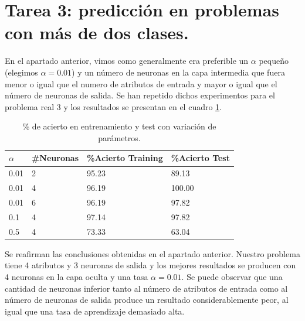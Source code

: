 \documentclass[spanish]{assignment}
\begin{document}
	\newpage
	\section{Tarea 3: predicción en problemas con más de dos clases.}
	
	En el apartado anterior, vimos como generalmente era preferible un $\alpha$ pequeño (elegimos $\alpha = 0.01$) y un número de neuronas en la capa intermedia que fuera menor o igual que el numero de atributos de entrada y mayor o igual que el número de neuronas de salida. Se han repetido dichos experimentos para el problema real 3 y los resultados se presentan en el cuadro \ref{tab:pr3chart}.	
	\begin{table}[ht!]
		\centering
		\begin{tabular}{|l|l|l|l|}
			\hline
			\textbf{$\alpha$} & \textbf{\#Neuronas} & \textbf{ \%Acierto Training} & \textbf{\%Acierto Test} \\ \hline
			0.01& 2 & 95.23 & 89.13 \\ \hline
			0.01& 4 & 96.19 & 100.00 \\ \hline
			0.01& 6 & 96.19 & 97.82 \\ \hline
			0.1& 4 & 97.14 & 97.82 \\ \hline
			0.5& 4 & 73.33 & 63.04 \\ \hline
		\end{tabular}
		\caption{\% de acierto en entrenamiento y test con variación de parámetros.}
		\label{tab:pr3chart}
	\end{table}
	
	Se reafirman las conclusiones obtenidas en el apartado anterior. Nuestro problema tiene 4 atributos y 3 neuronas de salida y los mejores resultados se producen con 4 neuronas en la capa oculta y una tasa $\alpha=0.01$. Se puede observar que una cantidad de neuronas inferior tanto al número de atributos de entrada como al número de neuronas de salida produce un resultado considerablemente peor, al igual que una tasa de aprendizaje demasiado alta.
	
\end{document}
